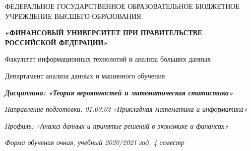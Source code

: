 \documentclass[a4paper,12pt]{article}
\begin{document}
\begin{center}
ФЕДЕРАЛЬНОЕ ГОСУДАРСТВЕННОЕ ОБРАЗОВАТЕЛЬНОЕ БЮДЖЕТНОЕ УЧРЕЖДЕНИЕ ВЫСШЕГО ОБРАЗОВАНИЯ

    \textbf{«ФИНАНСОВЫЙ УНИВЕРСИТЕТ ПРИ ПРАВИТЕЛЬСТВЕ РОССИЙСКОЙ ФЕДЕРАЦИИ»}

Факультет информационных технологий и анализа больших данных

Департамент анализа данных и машинного обучения

\textit{
	\textbf{Дисциплина: «Теория вероятностей и математическая статистика»}}

\textit{Направление подготовки: 01.03.02 «Прикладная математика и информатика»}

\textit{Профиль: «Анализ данных и принятие решений в экономике и финансах»}

\textit{Форма обучения очная, учебный 2020/2021 год, 4 семестр}



\end{center}
\end{document}
